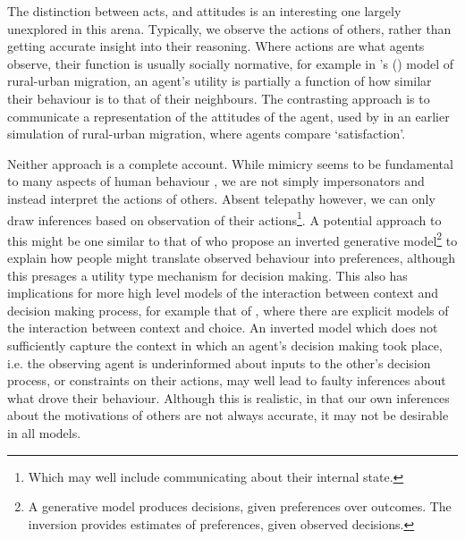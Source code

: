 \documentclass{article}
\begin{document}
The distinction between acts, and attitudes is an interesting one largely unexplored in this arena. Typically, we observe the actions of others, rather than getting accurate insight into their reasoning. Where actions are what agents observe, their function is usually socially normative, for example in \citeauthor{Silveira2005}'s (\citeyear{Silveira2005}) model of rural-urban migration, an agent's utility is partially a function of how similar their behaviour is to that of their neighbours. The contrasting approach is to communicate a representation of the attitudes of the agent, used by \citet{Espindola2006} in an earlier simulation of rural-urban migration, where agents compare `satisfaction'.

Neither approach is a complete account. While mimicry seems to be fundamental to many aspects of human behaviour \citep{Chartrand1999}, we are not simply impersonators and instead interpret the actions of others. Absent telepathy however, we can only draw inferences based on observation of their actions\footnote{Which may well include communicating about their internal state.}. A potential approach to this might be one similar to that of \citet{Jern2011a} who propose an inverted generative model\footnote{A generative model produces decisions, given preferences over outcomes. The inversion provides estimates of preferences, given observed decisions.} to explain how people might translate observed behaviour into preferences, although this presages a utility type mechanism for decision making. This also has implications for more high level models of the interaction between context and decision making process, for example that of \citet{Ben-Akiva2012}, where there are explicit models of the interaction between context and choice. An inverted model which does not sufficiently capture the context in which an agent's decision making took place, i.e. the observing agent is underinformed about inputs to the other's decision process, or constraints on their actions, may well lead to faulty inferences about what drove their behaviour. Although this is realistic, in that our own inferences about the motivations of others are not always accurate, it may not be desirable in all models.
\end{document}
